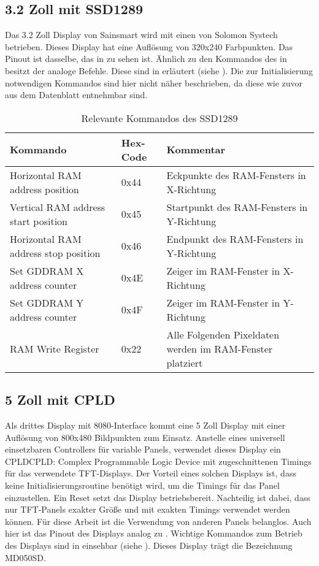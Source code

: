 \subsection{3.2 Zoll mit SSD1289}
Das 3.2 Zoll Display von Sainsmart wird mit einen  von Solomon Systech betrieben. Dieses Display hat eine Auflösung von 320x240 Farbpunkten. Das Pinout ist dasselbe, das in  zu sehen ist. Ähnlich zu den Kommandos des  in  besitzt der  analoge Befehle. Diese sind in   erläutert (siehe \cite{SSD2007}). Die zur Initialisierung notwendigen Kommandos sind hier nicht näher beschrieben, da diese wie zuvor aus dem Datenblatt entnehmbar sind.
\begin{table}[h]
\begin{tabular}{|p{4cm}|p{1cm}|p{8cm}|}\hline
\rowcolor{TableBackgroundColor}
   \textbf{Kommando} & \textbf{Hex-Code} & \textbf{Kommentar}\\ \hline
   Horizontal RAM address position & 0x44 & Eckpunkte des RAM-Fensters in X-Richtung \\ \hline
   Vertical RAM address start position & 0x45 & Startpunkt des RAM-Fensters in Y-Richtung \\ \hline
   Horizontal RAM address stop position & 0x46 & Endpunkt des  RAM-Fensters in Y-Richtung \\ \hline
   Set GDDRAM X address counter & 0x4E & Zeiger im  RAM-Fenster in X-Richtung \\ \hline
   Set GDDRAM Y address counter & 0x4F & Zeiger im RAM-Fenster in Y-Richtung \\ \hline
   RAM Write  Register & 0x22 & Alle Folgenden Pixeldaten werden im RAM-Fenster platziert \\ \hline
\end{tabular}
\caption{Relevante Kommandos des SSD1289}
\label{tab:Kommandos_SSD1289}
\end{table}


\subsection{5 Zoll mit CPLD}
Als drittes Display mit 8080-Interface kommt eine 5 Zoll Display mit einer Auflösung von 800x480 Bildpunkten zum Einsatz. Anstelle eines universell einsetzbaren Controllers für variable Panels, verwendet dieses Display ein CPLD{CPLD: Complex Programmable Logic Device} mit zugeschnittenen Timings für das verwendete TFT-Displays. Der Vorteil eines solchen Displays ist, dass keine Initialisierungsroutine benötigt wird, um die Timings für das Panel einzustellen. Ein Reset setzt das Display betriebsbereit. Nachteilig ist dabei, dass nur TFT-Panels exakter Größe und mit exakten Timings verwendet werden können. Für diese Arbeit ist die Verwendung von anderen Panels belanglos. Auch hier ist das Pinout des Displays analog zu .\newline
Wichtige Kommandos zum Betrieb des Displays sind in  einsehbar (siehe \cite{ITEAD2013}). Dieses Display trägt die Bezeichnung MD050SD.

